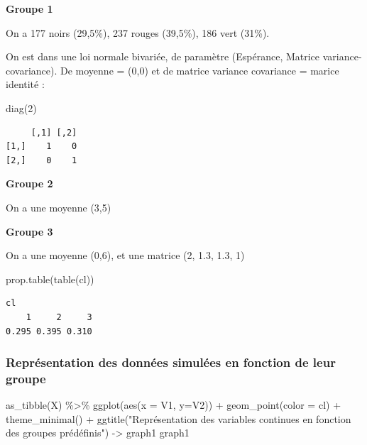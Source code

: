 \documentclass[
  french,
  letterpaper,
  DIV=11,
  numbers=noendperiod]{scrartcl}
\newenvironment{Shaded}{\begin{snugshade}}{\end{snugshade}}
\newcommand{\AttributeTok}[1]{\textcolor[rgb]{0.40,0.45,0.13}{#1}}
\newcommand{\DecValTok}[1]{\textcolor[rgb]{0.68,0.00,0.00}{#1}}
\newcommand{\FunctionTok}[1]{\textcolor[rgb]{0.28,0.35,0.67}{#1}}
\newcommand{\NormalTok}[1]{\textcolor[rgb]{0.00,0.23,0.31}{#1}}
\newcommand{\OtherTok}[1]{\textcolor[rgb]{0.00,0.23,0.31}{#1}}
\newcommand{\SpecialCharTok}[1]{\textcolor[rgb]{0.37,0.37,0.37}{#1}}
\newcommand{\StringTok}[1]{\textcolor[rgb]{0.13,0.47,0.30}{#1}}
\begin{document}
\textbf{Groupe 1}

On a 177 noirs (29,5\%), 237 rouges (39,5\%), 186 vert (31\%).

On est dans une loi normale bivariée, de paramètre (Espérance, Matrice
variance-covariance). De moyenne = (0,0) et de matrice variance
covariance = marice identité :

\begin{Shaded}
\begin{Highlighting}[]
\FunctionTok{diag}\NormalTok{(}\DecValTok{2}\NormalTok{)}
\end{Highlighting}
\end{Shaded}

\begin{verbatim}
     [,1] [,2]
[1,]    1    0
[2,]    0    1
\end{verbatim}

\textbf{Groupe 2}

On a une moyenne (3,5)

\textbf{Groupe 3}

On a une moyenne (0,6), et une matrice (2, 1.3, 1.3, 1)

\begin{Shaded}
\begin{Highlighting}[]
\FunctionTok{prop.table}\NormalTok{(}\FunctionTok{table}\NormalTok{(cl))}
\end{Highlighting}
\end{Shaded}

\begin{verbatim}
cl
    1     2     3 
0.295 0.395 0.310 
\end{verbatim}

\subsubsection{Représentation des données simulées en fonction de leur
groupe}\label{repruxe9sentation-des-donnuxe9es-simuluxe9es-en-fonction-de-leur-groupe}

\begin{Shaded}
\begin{Highlighting}[]
\FunctionTok{as\_tibble}\NormalTok{(X) }\SpecialCharTok{\%\textgreater{}\%} \FunctionTok{ggplot}\NormalTok{(}\FunctionTok{aes}\NormalTok{(}\AttributeTok{x =}\NormalTok{ V1, }\AttributeTok{y=}\NormalTok{V2)) }\SpecialCharTok{+} \FunctionTok{geom\_point}\NormalTok{(}\AttributeTok{color =}\NormalTok{ cl) }\SpecialCharTok{+} \FunctionTok{theme\_minimal}\NormalTok{() }\SpecialCharTok{+} \FunctionTok{ggtitle}\NormalTok{(}\StringTok{"Représentation des variables continues en fonction des groupes prédéfinis"}\NormalTok{) }\OtherTok{{-}\textgreater{}}\NormalTok{ graph1}
\NormalTok{graph1}
\end{Highlighting}
\end{Shaded}
\end{document}
